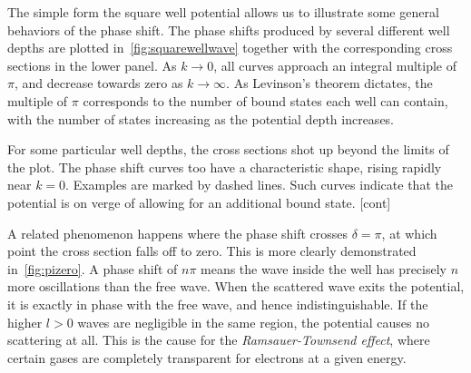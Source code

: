 The simple form the square well potential allows us to illustrate some general
behaviors of the phase shift. The phase shifts produced by several
different well depths are plotted
in~\cref{fig:squarewellwave} together with the corresponding cross sections 
in the lower panel. As \(k\to 0\), all curves approach an integral multiple of
\(\pi\), and decrease towards zero as \(k\to \infty\). As
Levinson's theorem dictates, the multiple of \(\pi\) corresponds to the number
of bound states each well can contain, with
the number of states increasing as the potential depth increases.

For some particular well depths, the cross sections shot up beyond the limits of
the plot. The phase shift curves too have a
characteristic shape, rising rapidly near \(k=0\). Examples are marked by dashed lines. Such curves indicate that the
potential is on verge of allowing for an additional bound state. [cont]

A related phenomenon happens where the phase shift crosses \(\delta=\pi\), at
which point the cross section falls off to zero. This is more
clearly demonstrated in~\cref{fig:pizero}. A phase shift of \(n\pi\) means the wave inside
the well has precisely \(n\) more oscillations than the free wave. When the scattered
wave exits the potential, it is exactly in phase with the free wave, and hence
indistinguishable. If the higher \(l>0\) waves are negligible in the same region,
the potential causes no scattering at all. This is the cause for the
\textit{Ramsauer-Townsend effect}\cite[p.~195]{taylor}, where certain gases are completely
transparent for electrons at a given energy.

